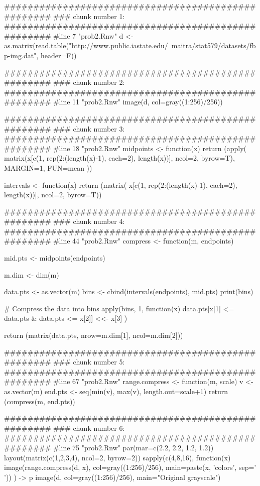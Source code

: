 ###################################################
### chunk number 1: 
###################################################
#line 7 "prob2.Rnw"
d <- as.matrix(read.table("http://www.public.iastate.edu/~maitra/stat579/datasets/fbp-img.dat", header=F))


###################################################
### chunk number 2: 
###################################################
#line 11 "prob2.Rnw"
image(d, col=gray((1:256)/256))


###################################################
### chunk number 3: 
###################################################
#line 18 "prob2.Rnw"
midpoints <- function(x){
    return (apply(
        matrix(x[c(1, rep(2:(length(x)-1), each=2), length(x))],
            ncol=2, byrow=T),
        MARGIN=1,
        FUN=mean
        ))
}

intervals <- function(x){
    return (matrix(
        x[c(1, rep(2:(length(x)-1), each=2), length(x))], 
        ncol=2, byrow=T))
}


###################################################
### chunk number 4: 
###################################################
#line 44 "prob2.Rnw"
compress <- function(m, endpoints){
    mid.pts <- midpoints(endpoints)

    m.dim <- dim(m)

    data.pts <- as.vector(m)
    bins <- cbind(intervals(endpoints), mid.pts)
    print(bins)

    # Compress the data into bins
    apply(bins, 1, 
        function(x){
            data.pts[x[1] <= data.pts & data.pts <= x[2]] <<- x[3]
        })

    return (matrix(data.pts, nrow=m.dim[1], ncol=m.dim[2]))
}


###################################################
### chunk number 5: 
###################################################
#line 67 "prob2.Rnw"
range.compress <- function(m, scale){
    v <- as.vector(m)
    end.pts <- seq(min(v), max(v), length.out=scale+1)
    return (compress(m, end.pts))
}


###################################################
### chunk number 6: 
###################################################
#line 75 "prob2.Rnw"
par(mar=c(2.2, 2.2, 1.2, 1.2))
layout(matrix(c(1,2,3,4), ncol=2, byrow=2))
sapply(c(4,8,16), 
    function(x){
        image(range.compress(d, x), 
        col=gray((1:256)/256),
        main=paste(x, 'colors', sep=' '))
    }) -> p 
image(d, col=gray((1:256)/256), main="Original grayscale")


